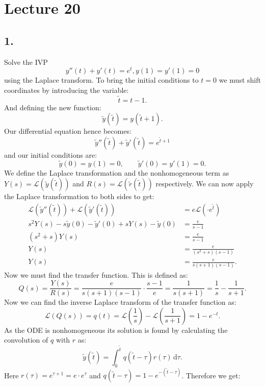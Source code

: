 \section*{Lecture 20}

\subsection*{1.} Solve the IVP
\[ 
y''(t) + y'(t) = e^{t}, y(1) = y'(1) = 0
\]
using the Laplace transform.
\bigbreak
To bring the initial conditions to $t = 0$ we must shift coordinates by introducing the variable:
\[ 
  \tilde{t} = t-1
.\]
And defining the new function:
\[ 
  \tilde{y}\left( \tilde{t} \right) = y(\tilde{t} + 1)
.\]
Our differential equation hence becomes:
\[ 
  \tilde{y}''\left( \tilde{t} \right) + \tilde{y}'\left( \tilde{t} \right) = e^{\tilde{t} + 1}
\]
and our initial conditions are:
\[ 
  \tilde{y}(0) = y(1) = 0, \qquad \tilde{y}'(0) = y'(1) = 0
.\]
We define the Laplace transformation and the nonhomogeneous term as $Y(s) = \mathcal{L}\left( \tilde{y}(\tilde{t}) \right) $ and $R(s) = \mathcal{L}\left( \tilde{r}(\tilde{t}) \right) $ respectively. We can now apply the Laplace transformation to both sides to get:
\begin{align*}
  \mathcal{L}\left( \tilde{y}''(\tilde{t}) \right) + \mathcal{L}\left( \tilde{y}'(\tilde{t}) \right) &= e\mathcal{L}\left(\cdot e^{\tilde{t}} \right) \\
  s^2 Y(s) - s\tilde{y}(0) - \tilde{y}'(0) + sY(s) - \tilde{y}(0) &= \frac{e}{s-1} \\
  \left( s^2+s \right) Y(s) &= \frac{e}{s-1} \\
  Y(s) &= \frac{e}{\left( s^2 + s \right) \left( s-1 \right) } \\
  Y(s) &= \frac{e}{s \left( s + 1 \right) \left( s-1 \right) }
.\end{align*}
Now we must find the transfer function. This is defined as:
\[ 
Q(s) = \frac{Y(s)}{R(s)} = \frac{e}{s \left( s+1 \right) \left( s-1 \right) } \cdot \frac{s-1}{e} = \frac{1}{s \left( s+1 \right) } = \frac{1}{s} - \frac{1}{s + 1}
.\]
Now we can find the inverse Laplace transform of the transfer function as:
\[ 
  \mathcal{L} \left( Q(s) \right) = q(t) = \mathcal{L}\left( \frac{1}{s} \right) - \mathcal{L}\left( \frac{1}{s+1} \right) = 1 - e^{-t}
.\]
As the ODE is nonhomogeneous its solution is found by calculating the convolution of $q$ with $r$ as:
\[ 
  \tilde{y}\left( \tilde{t} \right) = \int_{0}^{\tilde{t}} q \left( \tilde{t} - \tau \right) r (\tau) \, \mathrm{d}\tau
.\]
Here $r(\tau) = e^{\tau + 1} = e\cdot e^{\tau}$ and $q \left( \tilde{t} - \tau \right) = 1 - e^{- \left( \tilde{t} - \tau \right)}$. Therefore we get:
